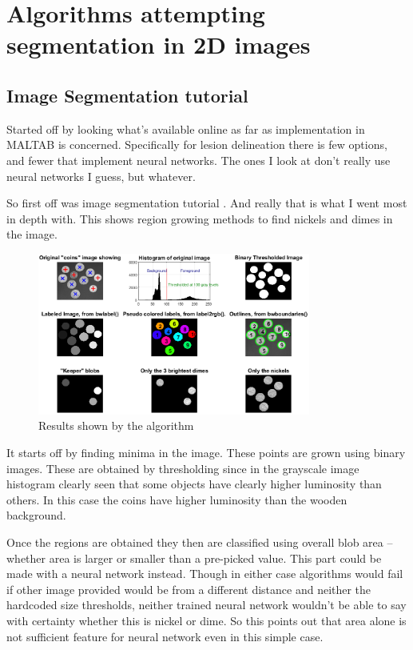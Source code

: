 \documentclass[12pt]{article}
\begin{document}
\section{Algorithms attempting segmentation in 2D images}
\label{sec:poMaAl}

\subsection{Image Segmentation tutorial}
\label{ssec:imSegTut}

Started off by looking what's available online as far as implementation in MALTAB is concerned. Specifically for lesion delineation there is few options, and fewer that implement neural networks. The ones I look at don't really use neural networks I guess, but whatever. 

So first off was image segmentation tutorial \cite{matlabSegmentationTutorial}. And really that is what I went most in depth with. This shows region growing methods to find nickels and dimes in the image. 

\begin{figure}[!htb]
\centering
\includegraphics[width=0.8\textwidth]{img/coinsThresholdedSegmentation}
\caption{Results shown by the algorithm}
\label{fig:coinsThresholdedSegmentation}
\end{figure}

It starts off by finding minima in the image. These points are grown using binary images. These are obtained by thresholding since in the grayscale image histogram clearly seen that some objects have clearly higher luminosity than others. In this case the coins have higher luminosity than the wooden background.

Once the regions are obtained they then are classified using overall blob area – whether area is larger or smaller than a pre-picked value. This part could be made with a neural network instead. Though in either case algorithms would fail if other image provided would be from a different distance and neither the hardcoded size thresholds, neither trained neural network wouldn't be able to say with certainty whether this is nickel or dime. So this points out that area alone is not sufficient feature for neural network even in this simple case.
\end{document}
